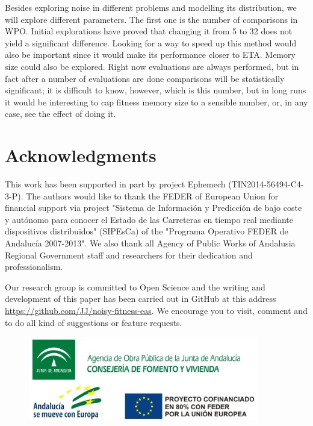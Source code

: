 \documentclass{llncs}
\begin{document}
Besides exploring noise in different problems and modelling its
distribution, we will explore different parameters. The first one is the number of comparisons in WPO. Initial
explorations have proved that changing it from 5 to 32 does not yield
a significant difference. Looking for a way to speed up this method
would also be important since it would make its performance closer to
ETA. Memory size could also be explored. Right now evaluations are
always performed, but in fact after a number of evaluations are done
comparisons will be statistically significant; it is difficult to
know, however, which is this number, but in long runs it would be
interesting to cap fitness memory size to a sensible number, or, in
any case, see the effect of doing it. 

\section{Acknowledgments}

This work has been supported in part by project Ephemech (TIN2014-56494-C4-3-P).
The authors would like to thank the FEDER of European Union for
financial support via project "Sistema de Informaci\'on y Predicci\'on de
bajo coste y aut\'onomo para conocer el Estado de las Carreteras en
tiempo real mediante dispositivos distribuidos" (SIPEsCa) of the
"Programa Operativo FEDER de Andaluc\'ia 2007-2013". We also thank all
Agency of Public Works of Andalusia Regional Government staff and
researchers for their dedication and professionalism.

Our research group is committed to Open Science and the writing and
development of this paper has been carried out in GitHub at this
address \url{https://github.com/JJ/noisy-fitness-eas}. We encourage you
to visit, comment and to do all kind of suggestions or feature
requests.



\begin{figure}[h]
\begin{center}
\includegraphics[width=10cm]{../images/logos_SIPESCA_2.jpg}
\end{center}
\end{figure}


\end{document}
